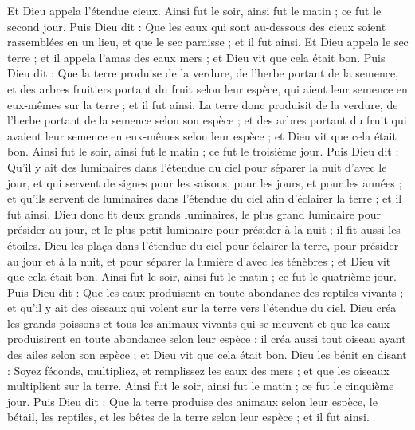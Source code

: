 \begin{multicols}{2}
Et Dieu appela l'étendue cieux. Ainsi fut le soir, ainsi fut le matin ; ce fut le second jour.
Puis Dieu dit : Que les eaux qui sont au-dessous des cieux soient rassemblées en un lieu, et que le sec paraisse ; et il fut ainsi.
Et Dieu appela le sec terre ; et il appela l'amas des eaux mers ; et Dieu vit que cela était bon.
Puis Dieu dit : Que la terre produise de la verdure, de l'herbe portant de la semence, et des arbres fruitiers portant du fruit selon leur espèce, qui aient leur semence en eux-mêmes sur la terre ; et il fut ainsi.
La terre donc produisit de la verdure, de l'herbe portant de la semence selon son espèce ; et des arbres portant du fruit qui avaient leur semence en eux-mêmes selon leur espèce ; et Dieu vit que cela était bon.
Ainsi fut le soir, ainsi fut le matin ; ce fut le troisième jour.
Puis Dieu dit : Qu'il y ait des luminaires dans l'étendue du ciel pour séparer la nuit d'avec le jour, et qui servent de signes pour les saisons, pour les jours, et pour les années ;
et qu'ils servent de luminaires dans l'étendue du ciel afin d'éclairer la terre ; et il fut ainsi.
Dieu donc fit deux grands luminaires, le plus grand luminaire pour présider au jour, et le plus petit luminaire pour présider à la nuit ; il fit aussi les étoiles.
Dieu les plaça dans l'étendue du ciel pour éclairer la terre,
pour présider au jour et à la nuit, et pour séparer la lumière d'avec les ténèbres ; et Dieu vit que cela était bon.
Ainsi fut le soir, ainsi fut le matin ; ce fut le quatrième jour.
Puis Dieu dit : Que les eaux produisent en toute abondance des reptiles vivants ; et qu'il y ait des oiseaux qui volent sur la terre vers l'étendue du ciel.
Dieu créa les grands poissons et tous les animaux vivants qui se meuvent et que les eaux produisirent en toute abondance selon leur espèce ; il créa aussi tout oiseau ayant des ailes selon son espèce ; et Dieu vit que cela était bon.
Dieu les bénit en disant : Soyez féconds, multipliez, et remplissez les eaux des mers ; et que les oiseaux multiplient sur la terre.
Ainsi fut le soir, ainsi fut le matin ; ce fut le cinquième jour.
Puis Dieu dit : Que la terre produise des animaux selon leur espèce, le bétail, les reptiles, et les bêtes de la terre selon leur espèce ; et il fut ainsi.

\end{multicols}
